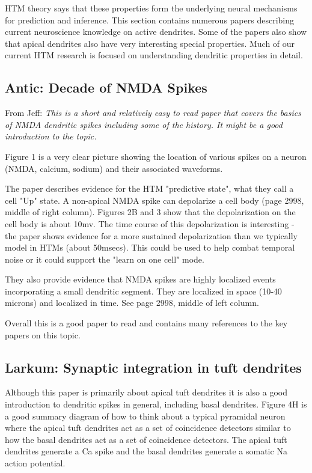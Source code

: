 \documentclass{article} %
\begin{document}
HTM theory says that these properties form the underlying neural mechanisms for
prediction and inference. This section contains numerous papers describing
current neuroscience knowledge on active dendrites.  Some of the papers also
show that apical dendrites also have very interesting special properties.  Much
of our current HTM research is focused on understanding dendritic properties in
detail.

\subsection{Antic: Decade of NMDA Spikes}
From Jeff: \emph{This is a short and relatively easy to read paper that covers
 the basics of NMDA dendritic spikes including some of the history.  It might be a
good introduction to the topic.}

Figure 1 is a very clear picture showing the location of various spikes on a
neuron (NMDA, calcium, sodium) and their associated waveforms.

The paper \cite{Antic2010} describes evidence for the HTM "predictive state",
what they call a cell "Up" state. A non-apical NMDA spike can depolarize a
cell body (page 2998, middle of right column). Figures 2B and 3 show that the
depolarization on the cell body is about 10mv. The time course of this depolarization is
interesting - the paper shows evidence for a more sustained depolarization than
we typically model in HTMs (about 50msecs). This could be used to help combat
temporal noise or it could support the "learn on one cell" mode.

They also provide evidence that NMDA spikes are highly localized events
incorporating a small dendritic segment. They are localized in space (10-40
microns) and localized in time. See page 2998, middle of left column.

Overall this is a good paper to read and contains many references to the key
papers on this topic.

\subsection{Larkum: Synaptic integration in tuft dendrites}

Although this paper \cite{Larkum2009} is primarily about apical tuft dendrites
it is also a good introduction to dendritic spikes in general, including basal
dendrites.  Figure 4H is a good summary diagram of how to think about a typical
pyramidal neuron where the apical tuft dendrites act as a set of coincidence
detectors similar to how the basal dendrites act as a set of coincidence
detectors.  The apical tuft dendrites generate a Ca spike and the basal
dendrites generate a somatic Na action potential.
\end{document}
